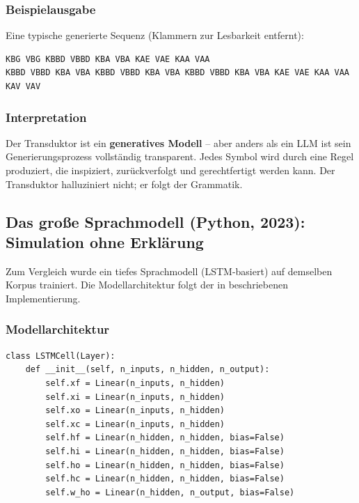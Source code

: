 \documentclass[12pt,a4paper]{article}
\begin{document}
\subsubsection{Beispielausgabe}

Eine typische generierte Sequenz (Klammern zur Lesbarkeit entfernt):

\begin{verbatim}
KBG VBG KBBD VBBD KBA VBA KAE VAE KAA VAA 
KBBD VBBD KBA VBA KBBD VBBD KBA VBA KBBD VBBD KBA VBA KAE VAE KAA VAA 
KAV VAV
\end{verbatim}

\subsubsection{Interpretation}

Der Transduktor ist ein \textbf{generatives Modell} – aber anders als ein LLM 
ist sein Generierungsprozess vollständig transparent. Jedes Symbol wird durch 
eine Regel produziert, die inspiziert, zurückverfolgt und gerechtfertigt werden 
kann. Der Transduktor halluziniert nicht; er folgt der Grammatik.

\subsection{Das große Sprachmodell (Python, 2023): Simulation ohne Erklärung}

Zum Vergleich wurde ein tiefes Sprachmodell (LSTM-basiert) auf demselben Korpus 
trainiert. Die Modellarchitektur folgt der in \citet{trask2020neural} 
beschriebenen Implementierung.

\subsubsection{Modellarchitektur}

\begin{lstlisting}[caption=LSTM-Sprachmodell in Python]
class LSTMCell(Layer):
    def __init__(self, n_inputs, n_hidden, n_output):
        self.xf = Linear(n_inputs, n_hidden)
        self.xi = Linear(n_inputs, n_hidden)
        self.xo = Linear(n_inputs, n_hidden)
        self.xc = Linear(n_inputs, n_hidden)
        self.hf = Linear(n_hidden, n_hidden, bias=False)
        self.hi = Linear(n_hidden, n_hidden, bias=False)
        self.ho = Linear(n_hidden, n_hidden, bias=False)
        self.hc = Linear(n_hidden, n_hidden, bias=False)
        self.w_ho = Linear(n_hidden, n_output, bias=False)
\end{lstlisting}
\end{document}
